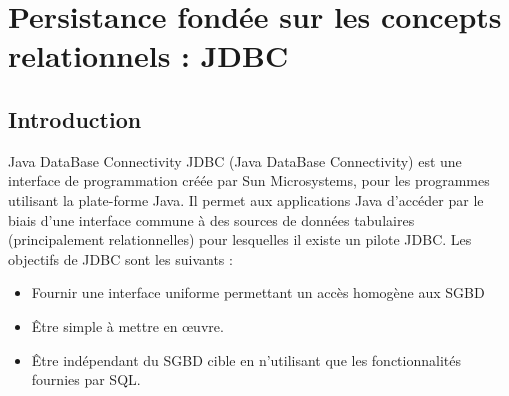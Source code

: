 \documentclass[xcolor=pdftex,x11names,table]{beamer}
\begin{document}
  \section{Persistance fondée sur les concepts relationnels : JDBC}
  \subsection{Introduction}
    \begin{frame}{Java DataBase Connectivity}
      JDBC (Java DataBase Connectivity) est une interface de programmation créée par Sun Microsystems, 
      pour les programmes utilisant la plate-forme Java. Il permet aux applications Java d'accéder par le biais d'une 
      interface commune à des sources de données tabulaires (principalement relationnelles) pour lesquelles il existe 
      un pilote JDBC.\pause
      \vfill
      Les objectifs de JDBC sont les suivants : 
      \begin{itemize}
        \item Fournir une interface uniforme permettant un accès homogène aux SGBD
        \item Être simple à mettre en œuvre.
        \item Être indépendant du SGBD cible en n'utilisant que les fonctionnalités fournies par SQL.
      \end{itemize}
    \end{frame}
  
\end{document}
